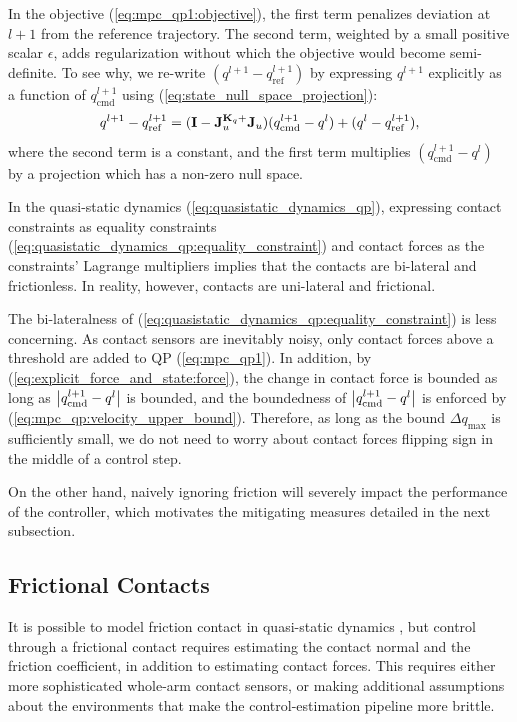 In the objective (\ref{eq:mpc_qp1:objective}), the first term penalizes deviation at $l+1$ from the reference trajectory. The second term, weighted by a small positive scalar $\epsilon$, adds regularization without which the objective would become semi-definite. To see why, we re-write $\left(q^{l+1} - q_\text{ref}^{l+1}\right)$ by expressing $q^{l+1}$ explicitly as a function of $q_\text{cmd}^{l+1}$ using (\ref{eq:state_null_space_projection}):
\begin{equation}
\label{eq:q_minus_q_ref}
q^{l+1} - q_\text{ref}^{l+1} = (\mb{I} - \J_u^{\mb{K}_q+}\J_u) (q^{l+1}_\text{cmd} - q^l) + (q^{l} - \qref[l+1]),
\end{equation}
where the second term is a constant, and the first term multiplies $(q_\text{cmd}^{l+1} - q^l)$ by a projection which has a non-zero null space.

In the quasi-static dynamics (\ref{eq:quasistatic_dynamics_qp}), expressing contact constraints as equality constraints (\ref{eq:quasistatic_dynamics_qp:equality_constraint}) and contact forces as the constraints' Lagrange multipliers implies that the contacts are bi-lateral and frictionless. In reality, however, contacts are uni-lateral and frictional.


The bi-lateralness of (\ref{eq:quasistatic_dynamics_qp:equality_constraint}) is less concerning. As contact sensors are inevitably noisy, only contact forces above a threshold are added to QP (\ref{eq:mpc_qp1}). In addition, by (\ref{eq:explicit_force_and_state:force}), the change in contact force is bounded as long as $\left|\qcmd[l+1] - q^l\right|$ is bounded, and the boundedness of $\left|\qcmd[l+1] - q^l\right|$ is enforced by (\ref{eq:mpc_qp:velocity_upper_bound}). Therefore, as long as the bound $\Delta q_\text{max}$ is sufficiently small, we do not need to worry about contact forces flipping sign in the middle of a control step. 

On the other hand, naively ignoring friction will severely impact the performance of the controller, which motivates the mitigating measures detailed in the next subsection.

\subsection{Frictional Contacts}
It is possible to model friction contact in quasi-static dynamics \cite{pang2021convex}, but control through a frictional contact requires estimating the contact normal and the friction coefficient, in addition to estimating contact forces. This requires either more sophisticated whole-arm contact sensors, or making additional assumptions about the environments that make the control-estimation pipeline more brittle. 

